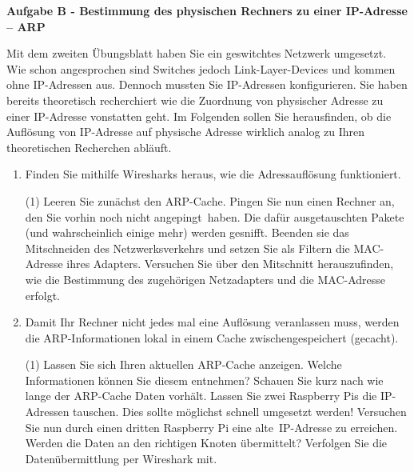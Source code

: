 \documentclass[paper=a4,fontsize=11pt]{scrartcl}%
\begin{document}
\begin{center}
\Large{\textbf{Aufgabe B - Bestimmung des physischen Rechners zu einer IP-Adresse -- ARP}}
\end{center}\vskip0.25in
Mit dem zweiten Übungsblatt haben Sie ein geswitchtes Netzwerk umgesetzt. Wie schon angesprochen sind Switches jedoch Link-Layer-Devices und kommen ohne IP-Adressen aus. Dennoch mussten Sie IP-Adressen konfigurieren. Sie haben bereits theoretisch recherchiert wie die Zuordnung von physischer Adresse zu einer IP-Adresse vonstatten geht. Im Folgenden sollen Sie herausfinden, ob die Auflösung von IP-Adresse auf physische Adresse wirklich analog zu Ihren theoretischen Recherchen abläuft.
\begin{enumerate}
	\item Finden Sie mithilfe Wiresharks heraus, wie die Adressauflösung funktioniert.
		\begin{tasks}(1)
			\task Leeren Sie zunächst den ARP-Cache.
			\task Pingen Sie nun einen Rechner an, den Sie vorhin noch nicht \glqq angepingt\grqq\ haben. Die dafür ausgetauschten Pakete (und wahrscheinlich einige mehr) werden \glqq gesnifft\grqq.
			\task Beenden sie das Mitschneiden des Netzwerksverkehrs und setzen Sie als Filtern die MAC-Adresse ihres Adapters.
			\task Versuchen Sie über den Mitschnitt herauszufinden, wie die Bestimmung des zugehörigen Netzadapters und die MAC-Adresse erfolgt.
		\end{tasks}
	\item Damit Ihr Rechner nicht jedes mal eine Auflösung veranlassen muss, werden die ARP-Informationen lokal in einem Cache zwischengespeichert (\glqq gecacht\grqq).
\begin{tasks}(1)
	\task Lassen Sie sich Ihren aktuellen ARP-Cache anzeigen. Welche Informationen können Sie diesem entnehmen?
	\task Schauen Sie kurz nach wie lange der ARP-Cache Daten vorhält.
	\task Lassen Sie zwei Raspberry Pis die IP-Adressen tauschen. Dies sollte möglichst schnell umgesetzt werden!
	\task Versuchen Sie nun durch einen dritten Raspberry Pi eine \glqq alte\grqq\ IP-Adresse zu erreichen. Werden die Daten an den richtigen Knoten übermittelt?
	\task Verfolgen Sie die Datenübermittlung per Wireshark mit.
\end{tasks}
\end{enumerate}
\end{document}
